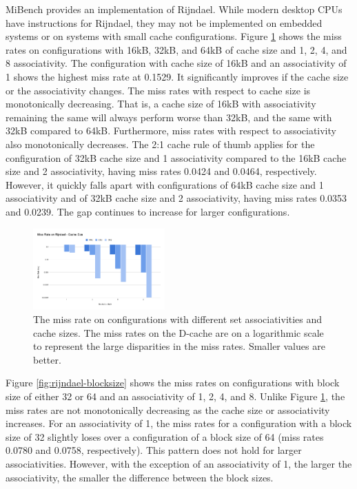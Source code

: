 \documentclass[conference]{IEEEtran}
\begin{document}
MiBench provides an implementation of Rijndael. While modern desktop CPUs have instructions for Rijndael\cite{gueron2010intel}, they may not be implemented on embedded systems or on systems with small cache configurations. Figure \ref{fig:rijndael-cachesize} shows the miss rates on configurations with 16kB, 32kB, and 64kB of cache size and 1, 2, 4, and 8 associativity. The configuration with cache size of 16kB and an associativity of 1 shows the highest miss rate at 0.1529. It significantly improves if the cache size or the associativity changes. The miss rates with respect to cache size is monotonically decreasing. That is, a cache size of 16kB with associativity remaining the same will always perform worse than 32kB, and the same with 32kB compared to 64kB. Furthermore, miss rates with respect to associativity also monotonically decreases. The 2:1 cache rule of thumb applies for the configuration of 32kB cache size and 1 associativity compared to the 16kB cache size and 2 associativity, having miss rates 0.0424 and 0.0464, respectively. However, it quickly falls apart with configurations of 64kB cache size and 1 associativity and of 32kB cache size and 2 associativity, having miss rates 0.0353 and 0.0239. The gap continues to increase for larger configurations.

\begin{figure}[H]
    \centering
    \includegraphics[width=0.45\textwidth]{images/rijndael_cachesize.png}
    \caption{The miss rate on configurations with different set associativities and cache sizes. The miss rates on the D-cache are on a logarithmic scale to represent the large disparities in the miss rates. Smaller values are better.}
    \label{fig:rijndael-cachesize}
\end{figure}

Figure \ref{fig:rijndael-blocksize} shows the miss rates on configurations with block size of either 32 or 64 and an associativity of 1, 2, 4, and 8. Unlike Figure \ref{fig:rijndael-cachesize}, the miss rates are not monotonically decreasing as the cache size or associativity increases. For an associativity of 1, the miss rates for a configuration with a block size of 32 slightly loses over a configuration of a block size of 64 (miss rates 0.0780 and 0.0758, respectively). This pattern does not hold for larger associativities. However, with the exception of an associativity of 1, the larger the associativity, the smaller the difference between the block sizes. 
\end{document}
